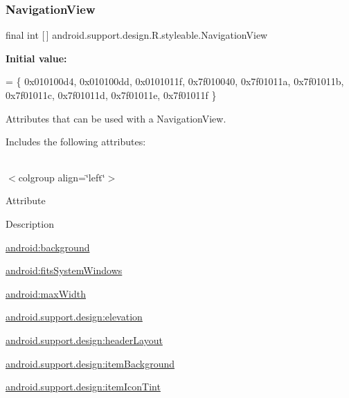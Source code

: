 \subsubsection{\texorpdfstring{Navigation\+View}{NavigationView}}
{\footnotesize\ttfamily final int \mbox{[}$\,$\mbox{]} android.\+support.\+design.\+R.\+styleable.\+Navigation\+View\hspace{0.3cm}{\ttfamily [static]}}

{\bfseries Initial value\+:}
\begin{DoxyCode}
= \{
            0x010100d4, 0x010100dd, 0x0101011f, 0x7f010040,
            0x7f01011a, 0x7f01011b, 0x7f01011c, 0x7f01011d,
            0x7f01011e, 0x7f01011f
        \}
\end{DoxyCode}
Attributes that can be used with a Navigation\+View. 

Includes the following attributes\+:

\tabulinesep=1mm
\begin{longtabu} spread 0pt [c]{*{0}{|X[-1]}|}
\hline
\end{longtabu}
$<$colgroup align=\char`\"{}left\char`\"{}$>$ 

Attribute

Description 

{\ttfamily \hyperlink{classandroid_1_1support_1_1design_1_1R_1_1styleable_a34e995ad1dfc358170b4d33b64c44416}{android\+:background}}

{\ttfamily \hyperlink{classandroid_1_1support_1_1design_1_1R_1_1styleable_a7d4c3e8d72fd2345f359507c8482446e}{android\+:fits\+System\+Windows}}

{\ttfamily \hyperlink{classandroid_1_1support_1_1design_1_1R_1_1styleable_a9bc98cd7d61a1ee939f9db53d2db45e4}{android\+:max\+Width}}

{\ttfamily \hyperlink{classandroid_1_1support_1_1design_1_1R_1_1styleable_a6b7bb0f2e0a1c1223302afa887d09d7a}{android.\+support.\+design\+:elevation}}

{\ttfamily \hyperlink{classandroid_1_1support_1_1design_1_1R_1_1styleable_a08ec1aafadcca65cbe363af269714f38}{android.\+support.\+design\+:header\+Layout}}

{\ttfamily \hyperlink{classandroid_1_1support_1_1design_1_1R_1_1styleable_a5dcfbed64b1824f484b663ac8f7e2ef1}{android.\+support.\+design\+:item\+Background}}

{\ttfamily \hyperlink{classandroid_1_1support_1_1design_1_1R_1_1styleable_ab2caef989041576424f200206e9224b3}{android.\+support.\+design\+:item\+Icon\+Tint}}

